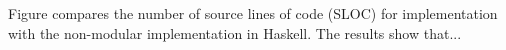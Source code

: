 Figure compares the number of source lines of code (SLOC) for \name
implementation with the non-modular implementation in Haskell. The results show
that...


\begin{comment}

\subsection{The Base Language (Arith)}

We start with a very simple language of arithmetic expressions, as shown on the
left hand side of Figure~\ref{fig:base-lang}. The base language has features
such as literals, addition, subtraction among others. As with examples in
Section~\ref{sec:extensibility}, we use visitors to encode datatypes. The
right hand side of Figure~\ref{fig:base-lang} defines the interfaces of the
operations.

\begin{figure}[t]
  \centering
  \begin{tabular}{cc}
    \begin{subfigure}[t]{0.45\textwidth}
      \centering
    \end{subfigure}
    &
    \begin{subfigure}[t]{0.45\textwidth}
      \centering
    \end{subfigure}
  \end{tabular}
  \caption{The base language (left) and the interfaces of the operations (right)}
  \label{fig:base-lang}
\end{figure}

\subsubsection{Evaluator}

The evaluation interface (\lstinline{IEval}) contains the \lstinline{eval}
method, which is a function from an evaluation environment (\lstinline{Env}) to
\lstinline{Maybe[Value]}. At this stage, the evaluation environment is not used,
but will be useful when we have variables. The evaluation of the base language
is quite straightforward, so we only show part of the code below:
To reduce boilerplate code when dealing with \lstinline{Maybe} values, like in
Haskell, we encode the bind operator \lstinline{bind} of the \lstinline{Maybe}
monad.


\end{comment}
